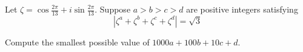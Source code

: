 Let $\zeta=\cos \frac{2 \pi}{13}+i \sin \frac{2 \pi}{13}$. Suppose $a>b>c>d$ are positive integers satisfying
$$
\left|\zeta^{a}+\zeta^{b}+\zeta^{c}+\zeta^{d}\right|=\sqrt{3}
$$

Compute the smallest possible value of $1000 a+100 b+10 c+d$.